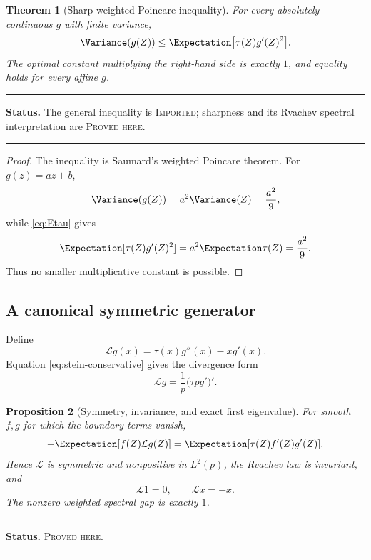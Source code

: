 \documentclass[11pt,oneside]{article}
\newtheorem{theorem}{Theorem}[section]
\newtheorem{proposition}[theorem]{Proposition}
\theoremstyle{definition}
\theoremstyle{remark}
\newenvironment{boxedremark}{%
  \par\smallskip\noindent\begin{center}\begin{minipage}{0.94\textwidth}%
  \color{black}\hrule\vspace{0.6em}\small
}{%
  \vspace{0.6em}\hrule\end{minipage}\end{center}\smallskip
}
\newcommand{\Imported}{\textsc{Imported}}
\newcommand{\ProvedHere}{\textsc{Proved here}}
\newcommand{\Status}[1]{%
  \begin{boxedremark}\textbf{Status.} #1.\end{boxedremark}}
\begin{document}
\begin{theorem}[Sharp weighted Poincare inequality]\label{thm:poincare}
For every absolutely continuous $g$ with finite variance,
\begin{equation}\label{eq:weighted-poincare}
 \Variance(g(Z))\le \Expectation\bigl[\tau(Z)g'(Z)^2\bigr].
\end{equation}
The optimal constant multiplying the right-hand side is exactly $1$, and equality
holds for every affine $g$.
\end{theorem}
\Status{The general inequality is \Imported; sharpness and its Rvachev spectral
interpretation are \ProvedHere}

\begin{proof}
The inequality is Saumard's weighted Poincare theorem.  For $g(z)=az+b$,
\[
 \Variance(g(Z))=a^2\Variance(Z)=\frac{a^2}{9},
\]
while \eqref{eq:Etau} gives
\[
 \Expectation[\tau(Z)g'(Z)^2]=a^2\Expectation\tau(Z)=\frac{a^2}{9}.
\]
Thus no smaller multiplicative constant is possible.
\end{proof}

\subsection{A canonical symmetric generator}
Define
\begin{equation}\label{eq:generator}
 \mathcal Lg(x)=\tau(x)g''(x)-xg'(x).
\end{equation}
Equation \eqref{eq:stein-conservative} gives the divergence form
\begin{equation}\label{eq:generator-divergence}
 \mathcal Lg=\frac1p\bigl(\tau p g'\bigr)'.
\end{equation}

\begin{proposition}[Symmetry, invariance, and exact first eigenvalue]
\label{prop:generator}
For smooth $f,g$ for which the boundary terms vanish,
\begin{equation}\label{eq:dirichlet}
 -\Expectation[f(Z)\mathcal Lg(Z)]
 =\Expectation[\tau(Z)f'(Z)g'(Z)].
\end{equation}
Hence $\mathcal L$ is symmetric and nonpositive in $L^2(p)$, the Rvachev law is
invariant, and
\begin{equation}\label{eq:first-eigen}
 \mathcal L1=0,
 \qquad \mathcal Lx=-x.
\end{equation}
The nonzero weighted spectral gap is exactly $1$.
\end{proposition}
\Status{\ProvedHere}
\end{document}
